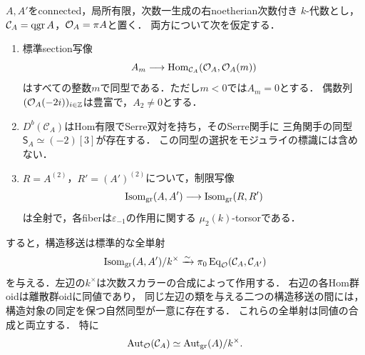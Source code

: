 \begin{theorem}[構造対象付きAbel圏のHom群oid]
\label{thm:abel-pointed-field-hom}
$A,A'$をconnected，局所有限，次数一生成の右noetherian次数付き
$k$-代数とし，$\mathcal C_A=\operatorname{qgr} A$，$\mathcal O_A=\pi A$と置く．
両方について次を仮定する．
\begin{enumerate}[label=\textup{(\roman*)}]
\item 標準section写像
\[
 A_m\longrightarrow\operatorname{Hom}_{\mathcal C_A}(\mathcal O_A,\mathcal O_A(m))
\]
はすべての整数$m$で同型である．ただし$m<0$では$A_m=0$とする．
偶数列$(\mathcal O_A(-2i))_{i\in\mathbb Z}$は豊富で，$A_2\ne0$とする．
\item $D^b(\mathcal C_A)$はHom有限でSerre双対を持ち，そのSerre関手に
三角関手の同型$\mathsf S_A\simeq(-2)[3]$が存在する．
この同型の選択をモジュライの標識には含めない．
\item $R=A^{(2)}$，$R'=(A')^{(2)}$について，制限写像
\[
 \operatorname{Isom}_{\rm gr}(A,A')
 \longrightarrow\operatorname{Isom}_{\rm gr}(R,R')
\]
は全射で，各fiberは$\varepsilon_{-1}$の作用に関する
$\mu_2(k)$-torsorである．
\end{enumerate}
すると，構造移送は標準的な全単射
\begin{equation}\label{eq:abel-pointed-hom-quotient}
 \operatorname{Isom}_{\rm gr}(A,A')/k^\times
 \xrightarrow{\sim}
 \pi_0\operatorname{Eq}_{\mathcal O}(\mathcal C_A,\mathcal C_{A'})
\end{equation}
を与える．左辺の$k^\times$は次数スカラーの合成によって作用する．
右辺の各Hom群oidは離散群oidに同値であり，
同じ左辺の類を与える二つの構造移送の間には，
構造対象の同定を保つ自然同型が一意に存在する．
これらの全単射は同値の合成と両立する．
特に
\begin{equation}\label{eq:abel-pointed-aut-quotient}
 \operatorname{Aut}_{\mathcal O}(\mathcal C_A)
 \simeq \operatorname{Aut}_{\rm gr}(A)/k^\times.
\end{equation}
\end{theorem}
